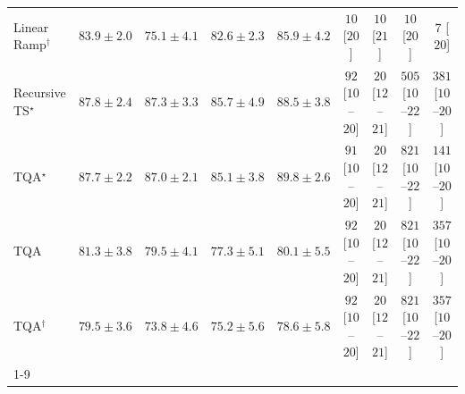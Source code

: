 \begin{tabular}{l|cccc|cccc|}
Linear Ramp$^\dagger$ & {\cellcolor[HTML]{045E93}} \color[HTML]{F1F1F1} $83.9\pm 2.0$ & {\cellcolor[HTML]{1E80B8}} \color[HTML]{F1F1F1} $75.1\pm 4.1$ & {\cellcolor[HTML]{046299}} \color[HTML]{F1F1F1} $82.6\pm 2.3$ & {\cellcolor[HTML]{045585}} \color[HTML]{F1F1F1} $85.9\pm 4.2$ & {\cellcolor[HTML]{FFF7F3}} \color[HTML]{000000} $10$ [$20$] & {\cellcolor[HTML]{FFF7F3}} \color[HTML]{000000} $10$ [$21$] & {\cellcolor[HTML]{FFF7F3}} \color[HTML]{000000} $10$ [$20$] & {\cellcolor[HTML]{FFF7F3}} \color[HTML]{000000} $7$ [$20$] \\
Recursive TS$^\star$ & {\cellcolor[HTML]{034B76}} \color[HTML]{F1F1F1} $87.8\pm 2.4$ & {\cellcolor[HTML]{034D79}} \color[HTML]{F1F1F1} $87.3\pm 3.3$ & {\cellcolor[HTML]{045687}} \color[HTML]{F1F1F1} $85.7\pm 4.9$ & {\cellcolor[HTML]{034871}} \color[HTML]{F1F1F1} $88.5\pm 3.8$ & {\cellcolor[HTML]{FDE4E1}} \color[HTML]{000000} $92$ [$10$--$20$] & {\cellcolor[HTML]{FFF4F0}} \color[HTML]{000000} $20$ [$12$--$21$] & {\cellcolor[HTML]{E13B98}} \color[HTML]{F1F1F1} $505$ [$10$--$22$] & {\cellcolor[HTML]{F87CA8}} \color[HTML]{F1F1F1} $381$ [$10$--$20$] \\
TQA$^\star$ & {\cellcolor[HTML]{034B76}} \color[HTML]{F1F1F1} $87.7\pm 2.2$ & {\cellcolor[HTML]{034F7D}} \color[HTML]{F1F1F1} $87.0\pm 2.1$ & {\cellcolor[HTML]{04598C}} \color[HTML]{F1F1F1} $85.1\pm 3.8$ & {\cellcolor[HTML]{034165}} \color[HTML]{F1F1F1} $89.8\pm 2.6$ & {\cellcolor[HTML]{FDE4E1}} \color[HTML]{000000} $91$ [$10$--$20$] & {\cellcolor[HTML]{FFF4F0}} \color[HTML]{000000} $20$ [$12$--$21$] & {\cellcolor[HTML]{4B006A}} \color[HTML]{F1F1F1} $821$ [$10$--$22$] & {\cellcolor[HTML]{FDD8D5}} \color[HTML]{000000} $141$ [$10$--$20$] \\
TQA & {\cellcolor[HTML]{0567A1}} \color[HTML]{F1F1F1} $81.3\pm 3.8$ & {\cellcolor[HTML]{056CAA}} \color[HTML]{F1F1F1} $79.5\pm 4.1$ & {\cellcolor[HTML]{0D75B3}} \color[HTML]{F1F1F1} $77.3\pm 5.1$ & {\cellcolor[HTML]{056AA6}} \color[HTML]{F1F1F1} $80.1\pm 5.5$ & {\cellcolor[HTML]{FDE4E1}} \color[HTML]{000000} $92$ [$10$--$20$] & {\cellcolor[HTML]{FFF4F0}} \color[HTML]{000000} $20$ [$12$--$21$] & {\cellcolor[HTML]{4B006A}} \color[HTML]{F1F1F1} $821$ [$10$--$22$] & {\cellcolor[HTML]{F988AD}} \color[HTML]{F1F1F1} $357$ [$10$--$20$] \\
TQA$^\dagger$ & {\cellcolor[HTML]{056CAA}} \color[HTML]{F1F1F1} $79.5\pm 3.6$ & {\cellcolor[HTML]{2786BB}} \color[HTML]{F1F1F1} $73.8\pm 4.6$ & {\cellcolor[HTML]{1C7FB8}} \color[HTML]{F1F1F1} $75.2\pm 5.6$ & {\cellcolor[HTML]{056FAF}} \color[HTML]{F1F1F1} $78.6\pm 5.8$ & {\cellcolor[HTML]{FDE4E1}} \color[HTML]{000000} $92$ [$10$--$20$] & {\cellcolor[HTML]{FFF4F0}} \color[HTML]{000000} $20$ [$12$--$21$] & {\cellcolor[HTML]{4B006A}} \color[HTML]{F1F1F1} $821$ [$10$--$22$] & {\cellcolor[HTML]{F988AD}} \color[HTML]{F1F1F1} $357$ [$10$--$20$] \\
\cline{1-9}
\bottomrule
\end{tabular}
